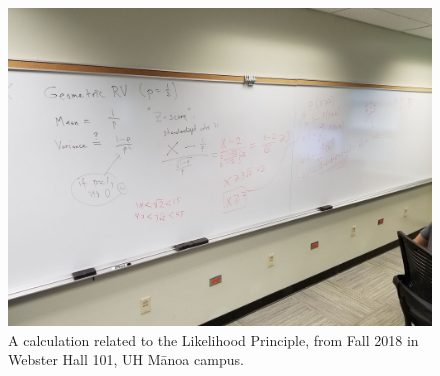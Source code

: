 \begin{figure}
\centering
\includegraphics[width=5in]{extraTex/eoceSolutions/likelihoodprinciple}
\caption{A calculation related to the Likelihood Principle, from Fall 2018 in Webster Hall 101, UH M\=anoa campus.}\label{LP}
\end{figure}
